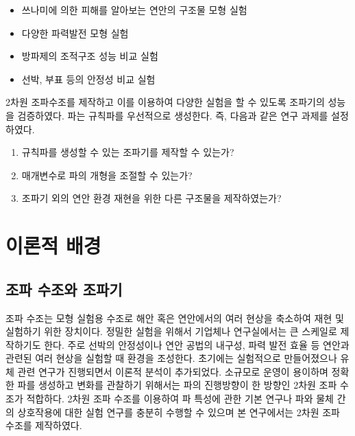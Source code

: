 \begin{itemize}
    \item 쓰나미에 의한 피해를 알아보는 연안의 구조물 모형 실험
    \item 다양한 파력발전 모형 실험
    \item 방파제의 조적구조 성능 비교 실험
    \item 선박, 부표 등의 안정성 비교 실험
\end{itemize}

2차원 조파수조를 제작하고 이를 이용하여 다양한 실험을 할 수 있도록 조파기의 성능을 검증하였다. 파는 규칙파를 우선적으로 생성한다. 즉, 다음과 같은 연구 과제를 설정하였다.

\begin{enumerate}
    \item 규칙파를 생성할 수 있는 조파기를 제작할 수 있는가?
    \item 매개변수로 파의 개형을 조절할 수 있는가?
    \item 조파기 외의 연안 환경 재현을 위한 다른 구조물을 제작하였는가?
\end{enumerate}
\section{이론적 배경}

\subsection{조파 수조와 조파기}
조파 수조는 모형 실험용 수조로 해안 혹은 연안에서의 여러 현상을 축소하여 재현 및 실험하기 위한 장치이다. 정밀한 실험을 위해서 기업체나 연구실에서는 큰 스케일로 제작하기도 한다. 주로 선박의 안정성이나 연안 공법의 내구성, 파력 발전 효율 등 연안과 관련된 여러 현상을 실험할 때 환경을 조성한다. 초기에는 실험적으로 만들어졌으나 유체 관련 연구가 진행되면서 이론적 분석이 추가되었다. 소규모로 운영이 용이하며 정확한 파를 생성하고 변화를 관찰하기 위해서는 파의 진행방향이 한 방향인 2차원 조파 수조가 적합하다. 2차원 조파 수조를 이용하여 파 특성에 관한 기본 연구나 파와 물체 간의 상호작용에 대한 실험 연구를 충분히 수행할 수 있으며 본 연구에서는 2차원 조파 수조를 제작하였다.


